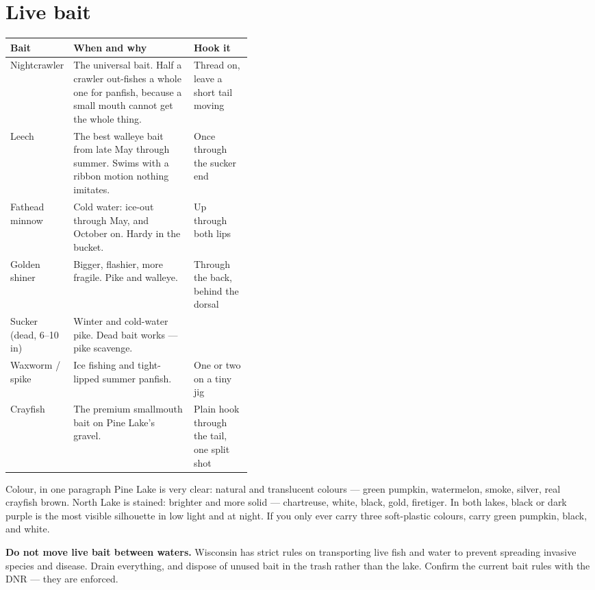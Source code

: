 \section{Live bait}
\begin{tabularx}{\linewidth}{@{}p{0.17\linewidth}L p{0.24\linewidth}@{}}
\toprule
\textbf{Bait} & \textbf{When and why} & \textbf{Hook it}\\
\midrule
Nightcrawler & The universal bait. Half a crawler out-fishes a whole one for panfish, because a small mouth cannot get the whole thing. & Thread on, leave a short tail moving\\
Leech & The best walleye bait from late May through summer. Swims with a ribbon motion nothing imitates. & Once through the sucker end\\
Fathead minnow & Cold water: ice-out through May, and October on. Hardy in the bucket. & Up through both lips\\
Golden shiner & Bigger, flashier, more fragile. Pike and walleye. & Through the back, behind the dorsal\\
Sucker (dead, 6--10\,in) & Winter and cold-water pike. Dead bait works --- pike scavenge. & \\
Waxworm / spike & Ice fishing and tight-lipped summer panfish. & One or two on a tiny jig\\
Crayfish & The premium smallmouth bait on Pine Lake's gravel. & Plain hook through the tail, one split shot\\
\bottomrule
\end{tabularx}

\begin{telospanel}{Colour, in one paragraph}
Pine Lake is very clear: natural and translucent colours --- green pumpkin, watermelon, smoke, silver, real crayfish brown. North Lake is stained: brighter and more solid --- chartreuse, white, black, gold, firetiger. In both lakes, black or dark purple is the most visible silhouette in low light and at night. If you only ever carry three soft-plastic colours, carry green pumpkin, black, and white.
\end{telospanel}

\begin{telosframe}
\textbf{Do not move live bait between waters.} Wisconsin has strict rules on transporting live fish and water to prevent spreading invasive species and disease. Drain everything, and dispose of unused bait in the trash rather than the lake. Confirm the current bait rules with the DNR --- they are enforced.
\end{telosframe}


